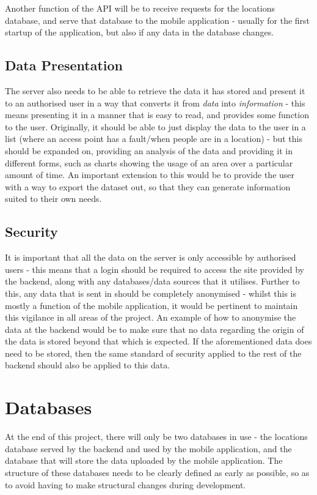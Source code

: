 \documentclass[11pt]{informatics-report}
\begin{document}
Another function of the API will be to receive requests for the locations database, and serve that database to the mobile application - usually for the first startup of the application, but also if any data in the database changes.  

\subsection{Data Presentation}

The server also needs to be able to retrieve the data it has stored and present it to an authorised user in a way that converts it from \textit{data} into \textit{information} - this means presenting it in a manner that is easy to read, and provides some function to the user. Originally, it should be able to just display the data to the user in a list (where an access point has a fault/when people are in a location) - but this should be expanded on, providing an analysis of the data and providing it in different forms, such as charts showing the usage of an area over a particular amount of time. An important extension to this would be to provide the user with a way to export the dataset out, so that they can generate information suited to their own needs.

\subsection{Security}

It is important that all the data on the server is only accessible by authorised users - this means that a login should be required to access the site provided by the backend, along with any databases/data sources that it utilises. Further to this, any data that is sent in should be completely anonymised - whilst this is mostly a function of the mobile application, it would be pertinent to maintain this vigilance in all areas of the project. An example of how to anonymise the data at the backend would be to make sure that no data regarding the origin of the data is stored beyond that which is expected. If the aforementioned data does need to be stored, then the same standard of security applied to the rest of the backend should also be applied to this data.


\section{Databases}

At the end of this project, there will only be two databases in use - the locations database served by the backend and used by the mobile application, and the database that will store the data uploaded by the mobile application. The structure of these databases needs to be clearly defined as early as possible, so as to avoid having to make structural changes during development. 
\end{document}
